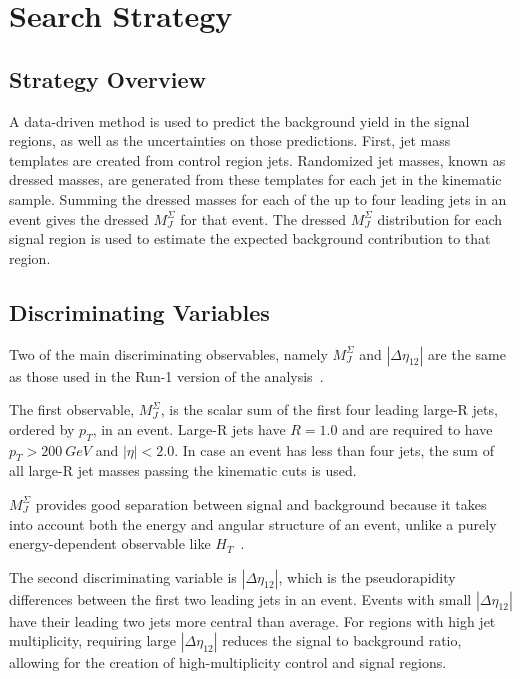 \chapter{Search Strategy}\label{ch:method}

\section{Strategy Overview}\label{sec:overview}

A data-driven method is used to predict the background yield in the signal regions, as well as the uncertainties on those predictions.
First, jet mass templates are created from control region jets.
Randomized jet masses, known as dressed masses, are generated from these templates for each jet in the kinematic sample.
Summing the dressed masses for each of the up to four leading jets in an event gives the dressed $M_{J}^{\Sigma}$ for that event.
The dressed $M_{J}^{\Sigma}$ distribution for each signal region is used to estimate the expected background contribution to that region.

\section{Discriminating Variables}\label{sec:variables}
Two of the main discriminating observables, namely $M_J^{\Sigma}$ and $|\Delta\eta_{12}|$ are the same as those used in the Run-1 version of the analysis~\cite{run1-multijet}.

The first observable, $M_J^{\Sigma}$, is the scalar sum of the first four leading large-R jets, ordered by $p_{T}$, in an event.
Large-R jets have $R=1.0$ and are required to have $p_{T} > 200~GeV$ and $|\eta|<2.0$.
In case an event has less than four jets, the sum of all large-R jet masses passing the kinematic cuts is used.

$M_{J}^{\Sigma}$ provides good separation between signal and background because it takes into account both the energy and angular structure of an event,
unlike a purely energy-dependent observable like $H_{T}$~\cite{hook-mj,elhedri-mj}.

The second discriminating variable is $|\Delta \eta_{12}|$, which is the pseudorapidity differences between the first two leading jets in an event.
Events with small $|\Delta \eta_{12}|$ have their leading two jets more central than average.
For regions with high jet multiplicity, requiring large $|\Delta \eta_{12}|$ reduces the signal to background ratio,
allowing for the creation of high-multiplicity control and signal regions.

